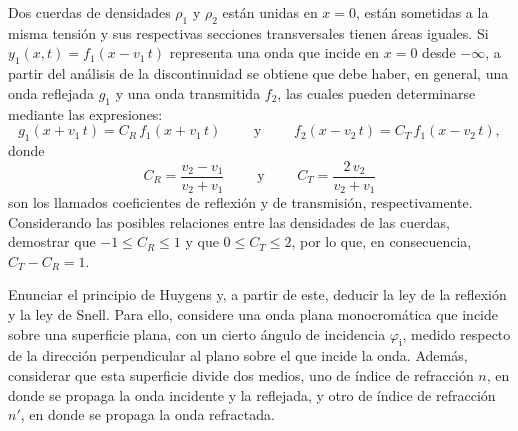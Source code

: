 \documentclass[addpoints]{exam}
\newcommand{\ver}[1]{\hat{\mathbf{#1}}}
\begin{document}
\begin{questions}

    \question Dos cuerdas de densidades $\rho_1$ y $\rho_2$ están unidas en $x=0$, están sometidas a la misma tensión y sus respectivas secciones transversales tienen áreas iguales. Si $y_1 (x,t) = f_1 \left(x - v_1 \, t\right)$ representa una onda que incide en $x=0$ desde $-\infty$, a partir del análisis de la discontinuidad se obtiene que debe haber, en general, una onda reflejada $g_1$ y una onda transmitida $f_2$, las cuales pueden determinarse mediante las expresiones: $$ g_1 \left(x + v_1 \, t\right) = C_R \, f_1 \left(x + v_1 \, t\right) \qquad \text{ y } \qquad f_2 \left(x - v_2 \, t\right) = C_T \, f_1 \left(x - v_2 \, t\right), $$ donde $$ C_R = \frac{v_2 - v_1}{v_2 + v_1} \qquad \text{ y } \qquad C_T = \frac{2 \, v_2}{v_2 + v_1} $$ son los llamados coeficientes de reflexión y de transmisión, respectivamente. Considerando las posibles relaciones entre las densidades de las cuerdas, demostrar que $-1 \le C_R \le 1$ y que $0 \le C_T \le 2$, por lo que, en consecuencia, $C_T - C_R = 1$.

    \question Enunciar el principio de Huygens y, a partir de este, deducir la ley de la reflexión y la ley de Snell. Para ello, considere una onda plana monocromática que incide sobre una superficie plana, con un cierto ángulo de incidencia $\varphi_\text{i}$, medido respecto de la dirección perpendicular al plano sobre el que incide la onda. Además, considerar que esta superficie divide dos medios, uno de índice de refracción $n$, en donde se propaga la onda incidente y la reflejada, y otro de índice de refracción $n'$, en donde se propaga la onda refractada.


\end{questions}
\end{document}
